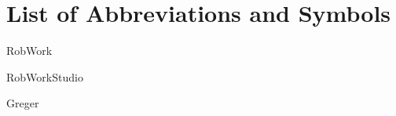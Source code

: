 \fancyfoot[LE,RO]{\thepage}
\section*{List of Abbreviations and Symbols}

\begin{description}[leftmargin=!,labelwidth=\widthof{\bfseries LONG}]
\item [RW] RobWork
\item [RWS]RobWorkStudio
\item [Diller]Greger
\end{description}



\clearpage
